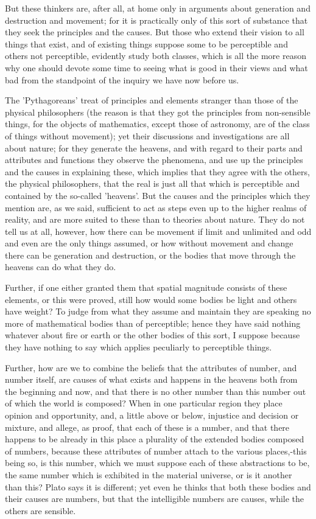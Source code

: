 \documentclass[oneside, 17pt, dvipsnames]{extbook}
\begin{document}
But these thinkers are, after all, at home only in arguments about generation and destruction and movement; for it is practically only of this sort of substance that they seek the principles and the causes. But those who extend their vision to all things that exist, and of existing things suppose some to be perceptible and others not perceptible, evidently study both classes, which is all the more reason why one should devote some time to seeing what is good in their views and what bad from the standpoint of the inquiry we have now before us.

The 'Pythagoreans' treat of principles and elements stranger than those of the physical philosophers (the reason is that they got the principles from non-sensible things, for the objects of mathematics, except those of astronomy, are of the class of things without movement); yet their discussions and investigations are all about nature; for they generate the heavens, and with regard to their parts and attributes and functions they observe the phenomena, and use up the principles and the causes in explaining these, which implies that they agree with the others, the physical philosophers, that the real is just all that which is perceptible and contained by the so-called 'heavens'. But the causes and the principles which they mention are, as we said, sufficient to act as steps even up to the higher realms of reality, and are more suited to these than to theories about nature. They do not tell us at all, however, how there can be movement if limit and unlimited and odd and even are the only things assumed, or how without movement and change there can be generation and destruction, or the bodies that move through the heavens can do what they do.

Further, if one either granted them that spatial magnitude consists of these elements, or this were proved, still how would some bodies be light and others have weight? To judge from what they assume and maintain they are speaking no more of mathematical bodies than of perceptible; hence they have said nothing whatever about fire or earth or the other bodies of this sort, I suppose because they have nothing to say which applies peculiarly to perceptible things.

Further, how are we to combine the beliefs that the attributes of number, and number itself, are causes of what exists and happens in the heavens both from the beginning and now, and that there is no other number than this number out of which the world is composed? When in one particular region they place opinion and opportunity, and, a little above or below, injustice and decision or mixture, and allege, as proof, that each of these is a number, and that there happens to be already in this place a plurality of the extended bodies composed of numbers, because these attributes of number attach to the various places,-this being so, is this number, which we must suppose each of these abstractions to be, the same number which is exhibited in the material universe, or is it another than this? Plato says it is different; yet even he thinks that both these bodies and their causes are numbers, but that the intelligible numbers are causes, while the others are sensible.
\end{document}
